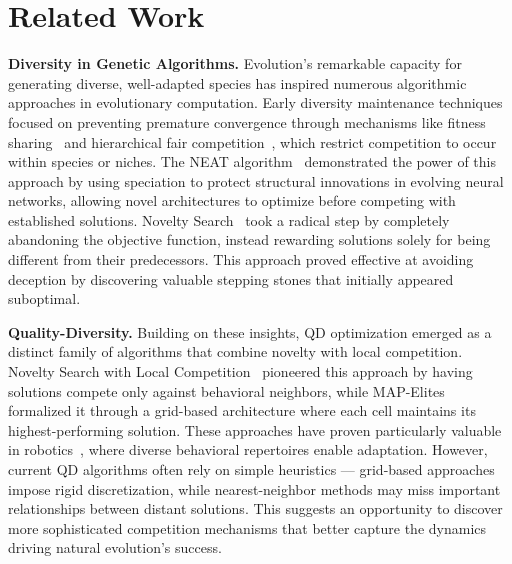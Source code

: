 \section{Related Work}
\textbf{Diversity in Genetic Algorithms.}
Evolution's remarkable capacity for generating diverse, well-adapted species has inspired numerous algorithmic approaches in evolutionary computation. Early diversity maintenance techniques focused on preventing premature convergence through mechanisms like fitness sharing~\citep{GeneticAlgorithmsSharing1987} and hierarchical fair competition~\citep{hfc}, which restrict competition to occur within species or niches. The NEAT algorithm~\citep{neat} demonstrated the power of this approach by using speciation to protect structural innovations in evolving neural networks, allowing novel architectures to optimize before competing with established solutions. Novelty Search~\citep{lehman_AbandoningObjectivesEvolution_2011} took a radical step by completely abandoning the objective function, instead rewarding solutions solely for being different from their predecessors. This approach proved effective at avoiding deception by discovering valuable stepping stones that initially appeared suboptimal.

\textbf{Quality-Diversity.}
Building on these insights, QD optimization emerged as a distinct family of algorithms that combine novelty with local competition. Novelty Search with Local Competition~\citep{nslc} pioneered this approach by having solutions compete only against behavioral neighbors, while MAP-Elites~\citep{mouret_IlluminatingSearchSpaces_2015} formalized it through a grid-based architecture where each cell maintains its highest-performing solution. These approaches have proven particularly valuable in robotics~\citep{cully_RobotsThatCan_2015}, where diverse behavioral repertoires enable adaptation. However, current QD algorithms often rely on simple heuristics --- grid-based approaches impose rigid discretization, while nearest-neighbor methods may miss important relationships between distant solutions. This suggests an opportunity to discover more sophisticated competition mechanisms that better capture the dynamics driving natural evolution's success.

